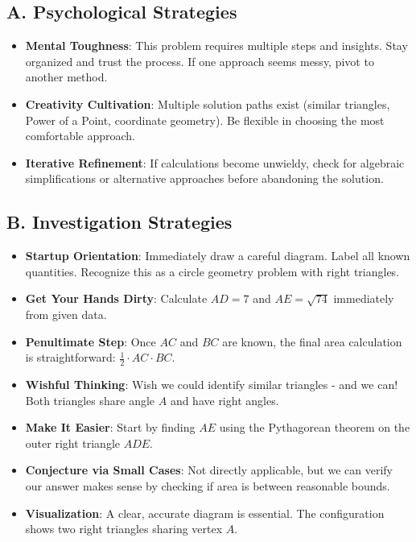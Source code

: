 \documentclass[]{article}
\begin{document}
\begin{strategicbox}
\subsection*{A. Psychological Strategies}
\begin{itemize}[leftmargin=*]
    \item \textbf{Mental Toughness}: This problem requires multiple steps and insights. Stay organized and trust the process. If one approach seems messy, pivot to another method.
    \item \textbf{Creativity Cultivation}: Multiple solution paths exist (similar triangles, Power of a Point, coordinate geometry). Be flexible in choosing the most comfortable approach.
    \item \textbf{Iterative Refinement}: If calculations become unwieldy, check for algebraic simplifications or alternative approaches before abandoning the solution.
\end{itemize}

\subsection*{B. Investigation Strategies}
\begin{itemize}[leftmargin=*]
    \item \textbf{Startup Orientation}: Immediately draw a careful diagram. Label all known quantities. Recognize this as a circle geometry problem with right triangles.
    \item \textbf{Get Your Hands Dirty}: Calculate $AD = 7$ and $AE = \sqrt{74}$ immediately from given data.
    \item \textbf{Penultimate Step}: Once $AC$ and $BC$ are known, the final area calculation is straightforward: $\frac{1}{2} \cdot AC \cdot BC$.
    \item \textbf{Wishful Thinking}: Wish we could identify similar triangles - and we can! Both triangles share angle $A$ and have right angles.
    \item \textbf{Make It Easier}: Start by finding $AE$ using the Pythagorean theorem on the outer right triangle $ADE$.
    \item \textbf{Conjecture via Small Cases}: Not directly applicable, but we can verify our answer makes sense by checking if area is between reasonable bounds.
    \item \textbf{Visualization}: A clear, accurate diagram is essential. The configuration shows two right triangles sharing vertex $A$.
\end{itemize}


\end{strategicbox}
\end{document}

